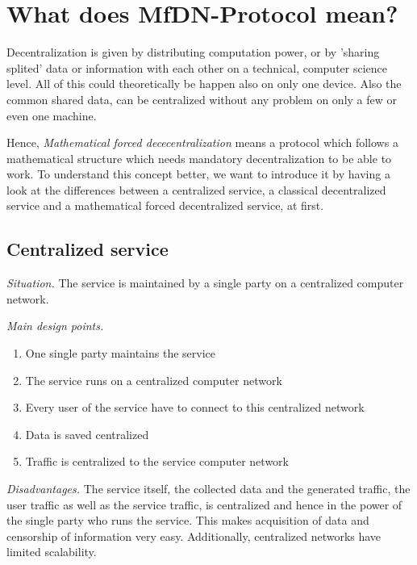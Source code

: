 \documentclass[12pt]{../document-templates/papers/one-column-mydashie/mydashie}
\newtheorem*{theorem A}{Theorem A}
\newtheorem*{theorem B}{N\"olker's Theorem}
\theoremstyle{remark}
\theoremstyle{remark}
\begin{document}
\section{What does MfDN-Protocol mean?}
\label{s:whatdoesmfdnprotocolmean}
Decentralization is given by distributing computation power, or by 'sharing splited' data or information with each other on a technical, computer science level. All of this could theoretically be happen also on only one device. Also the common shared data, can be centralized without any problem on only a few or even one machine.

Hence, \textit{Mathematical forced dececentralization} means a protocol which follows a mathematical structure which needs mandatory decentralization to be able to work. To understand this concept better, we want to introduce it by having a look at the differences between a centralized service, a classical decentralized service and a mathematical forced decentralized service, at first.
\subsection{Centralized service}
\label{ss:centralizedservice}
\textit{Situation.} The service is maintained by a single party on a centralized computer network.

\vspace{0.3cm}
\textit{Main design points.}
\begin{enumerate}
	\item One single party maintains the service
	\item The service runs on a centralized computer network
	\item Every user of the service have to connect to this centralized network
	\item Data is saved centralized
	\item Traffic is centralized to the service computer network
\end{enumerate}

\vspace{0.3cm}
\textit{Disadvantages.} The service itself, the collected data and the generated traffic, the user traffic as well as the service traffic, is centralized and hence in the power of the single party who runs the service. This makes acquisition of data and censorship of information very easy. Additionally, centralized networks have limited scalability.
\end{document}
